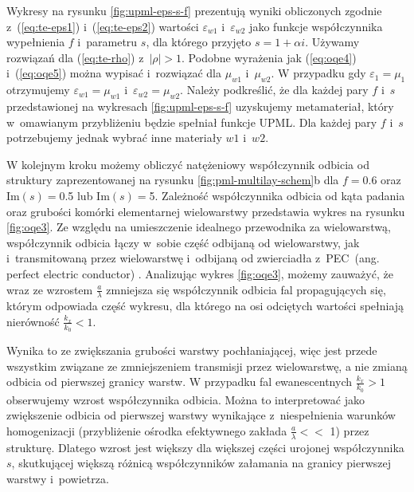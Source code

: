 Wykresy na rysunku \ref{fig:upml-eps-s-f} prezentują wyniki obliczonych zgodnie z~(\ref{eq:te-eps1}) i~(\ref{eq:te-eps2}) wartości $\varepsilon_{w1}$ i~$\varepsilon_{w2}$ jako funkcje współczynnika wypełnienia $f$ i~parametru $s$, dla którego przyjęto $s=1+\alpha i$. Używamy rozwiązań dla (\ref{eq:te-rho}) z~$|\rho|>1$. Podobne wyrażenia jak (\ref{eq:oqe4}) i~(\ref{eq:oqe5}) można wypisać i~rozwiązać dla $\mu_{w1}$ i~$\mu_{w2}$. W przypadku gdy $\varepsilon_1=\mu_1$ otrzymujemy $\varepsilon_{w1}=\mu_{w1}$ i~$\varepsilon_{w2}=\mu_{w2}$. Należy podkreślić, że dla każdej pary $f$ i~$s$ przedstawionej na wykresach \ref{fig:upml-eps-s-f} uzyskujemy metamateriał, który w~omawianym przybliżeniu będzie spełniał funkcje UPML. Dla każdej pary $f$ i~$s$ potrzebujemy jednak wybrać inne materiały $w1$ i~$w2$.

W kolejnym kroku możemy obliczyć natężeniowy współczynnik odbicia od struktury zaprezentowanej na rysunku \ref{fig:pml-multilay-schem}b dla $f=0.6$ oraz $\textrm{Im}(s)=$0.5 lub $\textrm{Im}(s)=$5. Zależność współczynnika odbicia od kąta padania oraz grubości komórki elementarnej wielowarstwy przedstawia wykres na rysunku \ref{fig:oqe3}. Ze względu na umieszczenie idealnego przewodnika za wielowarstwą, współczynnik odbicia łączy w~sobie część odbijaną od wielowarstwy, jak i~transmitowaną przez wielowarstwę i~odbijaną od zwierciadła z~PEC~(ang. perfect electric conductor) . Analizując wykres \ref{fig:oqe3}, możemy zauważyć, że wraz ze wzrostem $\frac{a}{\lambda}$ zmniejsza się współczynnik odbicia fal propagujących się, którym odpowiada część wykresu, dla którego na osi odciętych wartości spełniają nierówność $\frac{k_x}{k_0}<1$.

Wynika to ze zwiększania grubości warstwy pochłaniającej, więc jest przede wszystkim związane ze zmniejszeniem transmisji przez wielowarstwę, a nie zmianą odbicia od pierwszej granicy warstw. W przypadku fal ewanescentnych $\frac{k_x}{k_0}>1$ obserwujemy wzrost współczynnika odbicia. Można to interpretować jako zwiększenie odbicia od pierwszej warstwy wynikające z~niespełnienia warunków homogenizacji (przybliżenie ośrodka efektywnego zakłada $\frac{a}{\lambda} <<$ 1) przez strukturę. Dlatego wzrost jest większy dla większej części urojonej współczynnika $s$, skutkującej większą różnicą współczynników załamania na granicy pierwszej warstwy i~powietrza.


